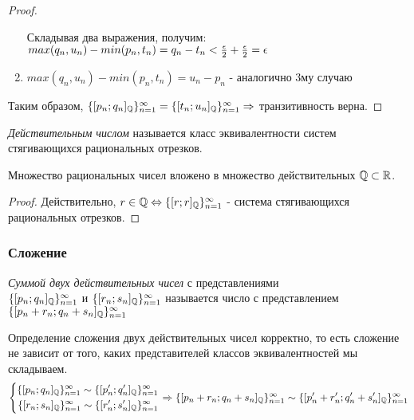 \begin{proof}
\begin{enumerate}
        Складывая два выражения, получим:
        $max(q_n, u_n) - min(p_n, t_n) = q_n - t_n < \frac{\epsilon}{2} + \frac{\epsilon}{2} = \epsilon$
        \item $max(q_n, u_n) - min(p_n, t_n) = u_n - p_n$ - аналогично 3му случаю
    \end{enumerate}
    Таким образом, $\{[p_n; q_n]_{\mathbb{Q}}\}_{n = 1}^\infty = \{[t_n; u_n]_{\mathbb{Q}}\}_{n = 1}^\infty \Rightarrow$ транзитивность верна.
\end{proof}

\begin{definition}
    \textit{Действительным числом} называется класс эквивалентности систем стягивающихся рациональных отрезков.
\end{definition}

\begin{proposition}
    Множество рациональных чисел вложено в множество действительных $\mathbb{Q} \subset \mathbb{R}$.
\end{proposition}

\begin{proof}
    Действительно, $r \in \mathbb{Q} \Leftrightarrow \{[r;r]_{\mathbb{Q}}\}_{n = 1}^\infty$ - система стягивающихся рациональных отрезков.
\end{proof}

\subsubsection*{Сложение}

\begin{definition}
    \textit{Суммой двух действительных чисел} с представлениями \\$\{[p_n; q_n]_{\mathbb{Q}}\}_{n = 1}^\infty$ и $\{[r_n; s_n]_{\mathbb{Q}}\}_{n = 1}^\infty$ называется число с представлением $\{[p_n + r_n; q_n + s_n]_{\mathbb{Q}}\}_{n = 1}^\infty$
\end{definition}

\begin{proposition}
    Определение сложения двух действительных чисел корректно, то есть сложение не зависит от того, каких представителей классов эквивалентностей мы складываем.
    $$
    \left\{\begin{aligned}\{[p_n; q_n]_{\mathbb{Q}}\}_{n = 1}^\infty \sim \{[p'_n; q'_n]_{\mathbb{Q}}\}_{n = 1}^\infty \\ 
            \{[r_n; s_n]_{\mathbb{Q}}\}_{n = 1}^\infty \sim \{[r'_n; s'_n]_{\mathbb{Q}}\}_{n = 1}^\infty\end{aligned}\right.
    \Rightarrow
    \{[p_n + r_n; q_n + s_n]_{\mathbb{Q}}\}_{n = 1}^\infty \sim \{[p'_n + r'_n; q'_n + s'_n]_{\mathbb{Q}}\}_{n = 1}^\infty
    $$
\end{proposition}

